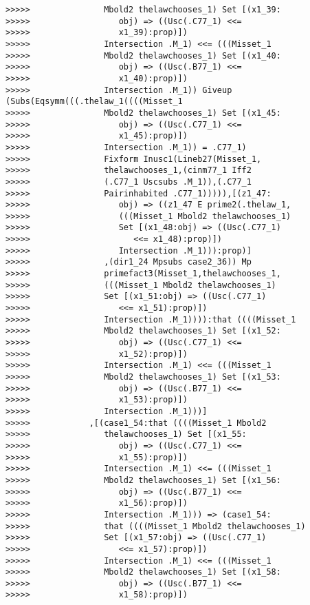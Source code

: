 \documentclass[12pt]{article}
\begin{document}
\begin{verbatim}
>>>>>               Mbold2 thelawchooses_1) Set [(x1_39:
>>>>>                  obj) => ((Usc(.C77_1) <<=
>>>>>                  x1_39):prop)])
>>>>>               Intersection .M_1) <<= (((Misset_1
>>>>>               Mbold2 thelawchooses_1) Set [(x1_40:
>>>>>                  obj) => ((Usc(.B77_1) <<=
>>>>>                  x1_40):prop)])
>>>>>               Intersection .M_1)) Giveup (Subs(Eqsymm(((.thelaw_1((((Misset_1
>>>>>               Mbold2 thelawchooses_1) Set [(x1_45:
>>>>>                  obj) => ((Usc(.C77_1) <<=
>>>>>                  x1_45):prop)])
>>>>>               Intersection .M_1)) = .C77_1)
>>>>>               Fixform Inusc1(Lineb27(Misset_1,
>>>>>               thelawchooses_1,(cinm77_1 Iff2
>>>>>               (.C77_1 Uscsubs .M_1)),(.C77_1
>>>>>               Pairinhabited .C77_1))))),[(z1_47:
>>>>>                  obj) => ((z1_47 E prime2(.thelaw_1,
>>>>>                  (((Misset_1 Mbold2 thelawchooses_1)
>>>>>                  Set [(x1_48:obj) => ((Usc(.C77_1)
>>>>>                     <<= x1_48):prop)])
>>>>>                  Intersection .M_1))):prop)]
>>>>>               ,(dir1_24 Mpsubs case2_36)) Mp
>>>>>               primefact3(Misset_1,thelawchooses_1,
>>>>>               (((Misset_1 Mbold2 thelawchooses_1)
>>>>>               Set [(x1_51:obj) => ((Usc(.C77_1)
>>>>>                  <<= x1_51):prop)])
>>>>>               Intersection .M_1)))):that ((((Misset_1
>>>>>               Mbold2 thelawchooses_1) Set [(x1_52:
>>>>>                  obj) => ((Usc(.C77_1) <<=
>>>>>                  x1_52):prop)])
>>>>>               Intersection .M_1) <<= (((Misset_1
>>>>>               Mbold2 thelawchooses_1) Set [(x1_53:
>>>>>                  obj) => ((Usc(.B77_1) <<=
>>>>>                  x1_53):prop)])
>>>>>               Intersection .M_1)))]
>>>>>            ,[(case1_54:that ((((Misset_1 Mbold2
>>>>>               thelawchooses_1) Set [(x1_55:
>>>>>                  obj) => ((Usc(.C77_1) <<=
>>>>>                  x1_55):prop)])
>>>>>               Intersection .M_1) <<= (((Misset_1
>>>>>               Mbold2 thelawchooses_1) Set [(x1_56:
>>>>>                  obj) => ((Usc(.B77_1) <<=
>>>>>                  x1_56):prop)])
>>>>>               Intersection .M_1))) => (case1_54:
>>>>>               that ((((Misset_1 Mbold2 thelawchooses_1)
>>>>>               Set [(x1_57:obj) => ((Usc(.C77_1)
>>>>>                  <<= x1_57):prop)])
>>>>>               Intersection .M_1) <<= (((Misset_1
>>>>>               Mbold2 thelawchooses_1) Set [(x1_58:
>>>>>                  obj) => ((Usc(.B77_1) <<=
>>>>>                  x1_58):prop)])

\end{verbatim}
\end{document}
